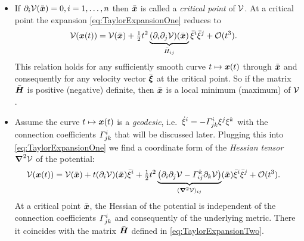 \begin{itemize}
 \item 
If $\partial_{i} \mathcal{V}(\bar{\boldsymbol{x}}) = 0, i=1,\ldots,n$ then $\bar{\boldsymbol{x}}$ is called a \textit{critical point} of $\mathcal{V}$.
At a critical point the expansion \eqref{eq:TaylorExpansionOne} reduces to
\begin{align}
 \mathcal{V}(\boldsymbol{x}(t))
 &= \mathcal{V}(\bar{\boldsymbol{x}})
  + \tfrac{1}{2} t^2 \underbrace{(\partial_{i} \partial_{j} \mathcal{V})(\bar{\boldsymbol{x}})}_{\bar{H}_{ij}} \bar{\xi}^{i} \bar{\xi}^{j}
  + \mathcal{O}(t^3).
\label{eq:TaylorExpansionTwo}
\end{align}
This relation holds for any sufficiently smooth curve $t\mapsto\boldsymbol{x}(t)$ through $\bar{\boldsymbol{x}}$ and consequently for any velocity vector $\bar{\boldsymbol{\xi}}$ at the critical point.
So if the matrix $\bar{\boldsymbol{H}}$ is positive (negative) definite, then $\bar{\boldsymbol{x}}$ is a local minimum (maximum) of $\mathcal{V}$.

\item
Assume the curve $t\mapsto\boldsymbol{x}(t)$ is a \textit{geodesic}, i.e.\ $\dot{\xi}^{i} = -\varGamma^{i}_{jk} \xi^{j} \xi^{k}$ with the connection coefficients $\varGamma^{i}_{jk}$ that will be discussed later.
Plugging this into \eqref{eq:TaylorExpansionOne} we find a coordinate form of the \textit{Hessian tensor} $\boldsymbol{\nabla}^2 \mathcal{V}$ of the potential:
\begin{align}
 \mathcal{V}(\boldsymbol{x}(t))
 &= \mathcal{V}(\bar{\boldsymbol{x}})
  + t (\partial_{i} \mathcal{V})(\bar{\boldsymbol{x}}) \bar{\xi}^{i}
  + \tfrac{1}{2} t^2 \underbrace{\big( \partial_{i} \partial_{j} \mathcal{V} - \varGamma^{k}_{ij} \partial_{k} \mathcal{V} \big)}_{(\boldsymbol{\nabla}^2\mathcal{V})_{ij}}(\bar{\boldsymbol{x}})  \bar{\xi}^{i} \bar{\xi}^{j}
  + \mathcal{O}(t^3).
\end{align}
At a critical point $\bar{\boldsymbol{x}}$, the Hessian of the potential is independent of the connection coefficients $\varGamma^{i}_{jk}$ and consequently of the underlying metric.
There it coincides with the matrix $\bar{\boldsymbol{H}}$ defined in \eqref{eq:TaylorExpansionTwo}.
\end{itemize} 

